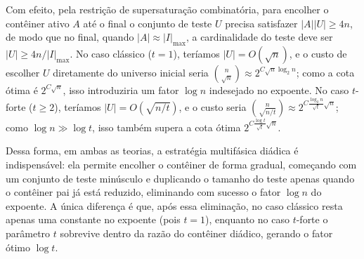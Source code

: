 \documentclass[reqno,a4paper,12pt]{amsart}
\begin{document}
Com efeito, pela restrição de supersaturação combinatória, para encolher o contêiner ativo $A$ até o final o conjunto de teste $U$ precisa satisfazer $|A||U| \ge 4n$, de modo que no final, quando $|A| \approx |I|_{\max}$, a cardinalidade do teste deve ser $|U| \ge 4n/|I|_{\max}$.
No caso clássico ($t=1$), teríamos $|U| = O(\sqrt{n})$, e o custo de escolher $U$ diretamente do universo inicial seria $\binom{n}{\sqrt{n}} \approx 2^{C\sqrt{n}\log_2 n}$; como a cota ótima é $2^{C\sqrt{n}}$, isso introduziria um fator $\log n$ indesejado no expoente.
No caso $t$-forte ($t \ge 2$), teríamos $|U| = O(\sqrt{n/t})$, e o custo seria $\binom{n}{\sqrt{n/t}} \approx 2^{C\frac{\log_2 n}{\sqrt{t}}\sqrt{n}}$; como $\log n \gg \log t$, isso também supera a cota ótima $2^{C\frac{\log t}{\sqrt{t}}\sqrt{n}}$.

Dessa forma, em ambas as teorias, a estratégia multifásica diádica é indispensável: ela permite encolher o contêiner de forma gradual, começando com um conjunto de teste minúsculo e duplicando o tamanho do teste apenas quando o contêiner pai já está reduzido, eliminando com sucesso o fator $\log n$ do expoente. A única diferença é que, após essa eliminação, no caso clássico resta apenas uma constante no expoente (pois $t=1$), enquanto no caso $t$-forte o parâmetro $t$ sobrevive dentro da razão do contêiner diádico, gerando o fator ótimo $\log t$.






\end{document}
